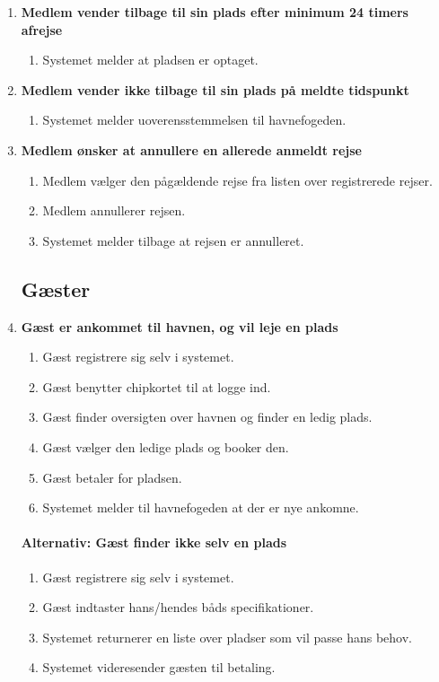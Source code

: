 \begin{enumerate}
    \item{\bf{Medlem vender tilbage til sin plads efter minimum 24 timers afrejse}}
      \begin{enumerate}
        \item Systemet melder at pladsen er optaget.
      \end{enumerate}


    \item{\bf{Medlem vender ikke tilbage til sin plads på meldte tidspunkt}}
      \begin{enumerate}
        \item Systemet melder uoverensstemmelsen til havnefogeden.
      \end{enumerate}


    \item{\bf{Medlem ønsker at annullere en allerede anmeldt rejse}}
      \begin{enumerate}
        \item Medlem vælger den pågældende rejse fra listen over registrerede rejser.
        \item Medlem annullerer rejsen.
        \item Systemet melder tilbage at rejsen er annulleret.
      \end{enumerate}

	  
\subsection{Gæster}


    \item{\bf{Gæst er ankommet til havnen, og vil leje en plads}}
      \begin{enumerate}
        \item Gæst registrere sig selv i systemet.
        \item Gæst benytter chipkortet til at logge ind.
        \item Gæst finder oversigten over havnen og finder en ledig plads.
        \item Gæst vælger den ledige plads og booker den.
		\item Gæst betaler for pladsen.
        \item Systemet melder til havnefogeden at der er nye ankomne.
      \end{enumerate}

    \paragraph{Alternativ: Gæst finder ikke selv en plads}
      \begin{enumerate}
        \item Gæst registrere sig selv i systemet.
		\item Gæst indtaster hans/hendes båds specifikationer.
        \item Systemet returnerer en liste over pladser som vil passe hans behov.
        \item Systemet videresender gæsten til betaling.


\end{enumerate}
\end{enumerate}
